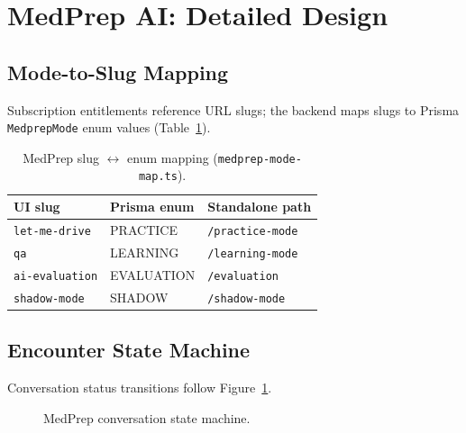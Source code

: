 

\section{MedPrep AI: Detailed Design}
\subsection{Mode-to-Slug Mapping}
Subscription entitlements reference URL slugs; the backend maps slugs to Prisma \texttt{MedprepMode} enum values (Table~\ref{tab:slug-map}).

\begin{table}[htbp]
  \centering
  \caption{MedPrep slug $\leftrightarrow$ enum mapping (\texttt{medprep-mode-map.ts}).}
  \label{tab:slug-map}
  \begin{tabular}{@{}lll@{}}
    \toprule
    \textbf{UI slug} & \textbf{Prisma enum} & \textbf{Standalone path} \\
    \midrule
    \texttt{let-me-drive} & PRACTICE & \texttt{/practice-mode} \\
    \texttt{qa} & LEARNING & \texttt{/learning-mode} \\
    \texttt{ai-evaluation} & EVALUATION & \texttt{/evaluation} \\
    \texttt{shadow-mode} & SHADOW & \texttt{/shadow-mode} \\
    \bottomrule
  \end{tabular}
\end{table}

\subsection{Encounter State Machine}
Conversation status transitions follow Figure~\ref{fig:state-machine}.

\begin{figure}[htbp]
  \centering
  \caption{MedPrep conversation state machine.}
  \label{fig:state-machine}
\end{figure}


